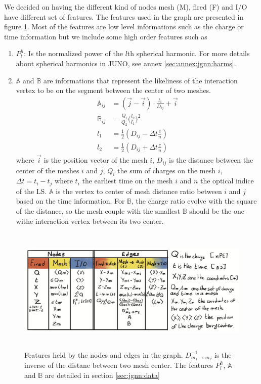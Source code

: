 \documentclass[../main.tex]{subfiles}
\begin{document}
We decided on having the different kind of nodes {\color{Dandelion} mesh (M)}, {\color{red} fired (F)} and {\color{blue} I/O} have different set of features. The features used in the graph are presented in figure \ref{fig:jgnn:graph_features}. Most of the features are low level informations such as the charge or time information but we include some high order features such as
\begin{enumerate}
  \item $P^h_l$: Is the normalized power of the $l$th spherical harmonic. For more details about spherical harmonics in JUNO, see annex \ref{sec:annex:jgnn:harms}.
  \item $\mathbb{A}$ and $\mathbb{B}$ are informations that represent the likeliness of the interaction vertex to be on the segment between the center of two meshes.
    \begin{align}
      \mathbb{A}_{ij} &= (\vec{j} - \vec{i})\cdot\frac{l_1}{D_{ij}} + \vec{i} \\
      \mathbb{B}_{ij} &= \frac{Q_i}{Q_2} \bigg(\frac{l_2}{l_1}\bigg)^2 \\
      l_1 &= \frac{1}{2}(D_{ij} - \Delta t \frac{c}{n}) \\
      l_2 &= \frac{1}{2}(D_{ij} + \Delta t \frac{c}{n})
    \end{align}
    where $\vec{i}$ is the position vector of the mesh $i$, $D_{ij}$ is the distance between the center of the meshes $i$ and $j$, $Q_i$ the sum of charges on the mesh $i$, $\Delta t = t_i - t_j$ where $t_i$ the earliest time on the mesh $i$ and $n$ the optical indice of the LS. $\mathbb{A}$ is the vertex to center of mesh distance ratio between $i$ and $j$ based on the time information. For $\mathbb{B}$, the charge ratio evolve with the square of the distance, so the mesh couple with the smallest $\mathbb{B}$ should be the one withe interaction vertex between its two center.
\end{enumerate}

\begin{figure}[ht]
  \centering
  \includegraphics[height=6cm]{images/jgnn/graph_features.png}
  \caption{Features held by the nodes and edges in the graph. $D^{-1}_{m_1 \rightarrow m_2}$ is the inverse of the distane between two mesh center. The features $P^h_l$, $\mathbb{A}$ and $\mathbb{B}$ are detailed in section \ref{sec:jgnn:data}}
  \label{fig:jgnn:graph_features}
\end{figure}
\end{document}
